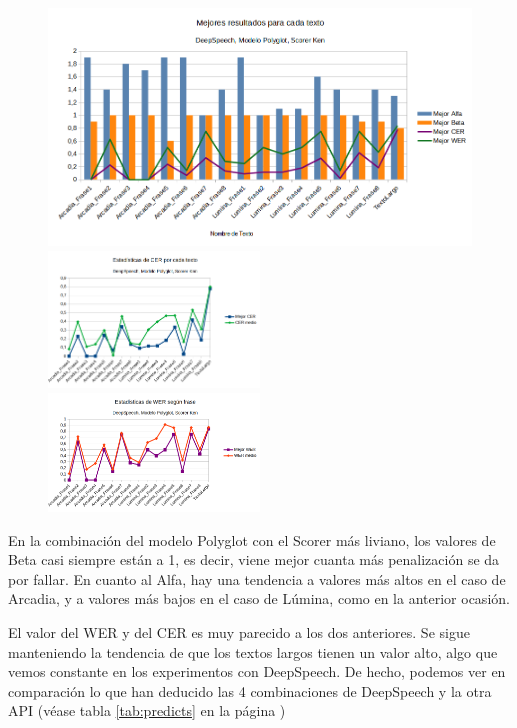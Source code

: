 \begin{figure}[H]
	\includegraphics[width=\textwidth]{imagenes/MejoresResultados_DeepSpeechIvanKenPolyglot.png} \\
	\includegraphics[width=0.5\textwidth]{imagenes/CER_DeepSpeechIvanKenPolyglot.png} \hfill \includegraphics[width=0.5\textwidth]{imagenes/WER_DeepspeechIvanKenPolyglot.png}
\end{figure}

En la combinación del modelo Polyglot con el Scorer más liviano, los valores de Beta casi siempre están a 1, es decir, viene mejor cuanta más penalización se da por fallar. En cuanto al Alfa, hay una tendencia a valores más altos en el caso de Arcadia, y a valores más bajos en el caso de Lúmina, como en la anterior ocasión.

El valor del WER y del CER es muy parecido a los dos anteriores. Se sigue manteniendo la tendencia de que los textos largos tienen un valor alto, algo que vemos constante en los experimentos con DeepSpeech. De hecho, podemos ver en comparación lo que han deducido las 4 combinaciones de DeepSpeech y la otra API (véase tabla \ref{tab:predicts} en la página \pageref{tab:predicts})

